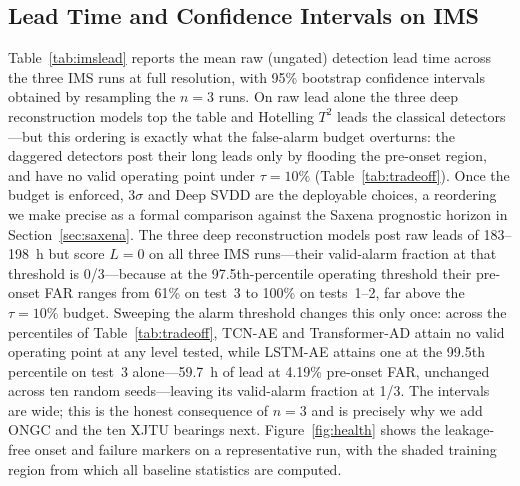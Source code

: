 \documentclass[IJPHM, 2026, 0]{PHMSociety}
\begin{document}
\subsection{Lead Time and Confidence Intervals on IMS}
Table~\ref{tab:imslead} reports the mean raw (ungated) detection lead time across the three IMS runs at full resolution, with 95\% bootstrap confidence intervals obtained by resampling the $n=3$ runs. On raw lead alone the three deep reconstruction models top the table and Hotelling $T^2$ leads the classical detectors---but this ordering is exactly what the false-alarm budget overturns: the daggered detectors post their long leads only by flooding the pre-onset region, and have no valid operating point under $\tau=10\%$ (Table~\ref{tab:tradeoff}). Once the budget is enforced, $3\sigma$ and Deep SVDD are the deployable choices, a reordering we make precise as a formal comparison against the Saxena prognostic horizon in Section~\ref{sec:saxena}. The three deep reconstruction models post raw leads of 183--198~h but score $L=0$ on all three IMS runs---their valid-alarm fraction at that threshold is 0/3---because at the 97.5th-percentile operating threshold their pre-onset FAR ranges from 61\% on test~3 to 100\% on tests~1--2, far above the $\tau=10\%$ budget. Sweeping the alarm threshold changes this only once: across the percentiles of Table~\ref{tab:tradeoff}, TCN-AE and Transformer-AD attain no valid operating point at any level tested, while LSTM-AE attains one at the 99.5th percentile on test~3 alone---59.7~h of lead at 4.19\% pre-onset FAR, unchanged across ten random seeds---leaving its valid-alarm fraction at 1/3. The intervals are wide; this is the honest consequence of $n=3$ and is precisely why we add ONGC and the ten XJTU bearings next. Figure~\ref{fig:health} shows the leakage-free onset and failure markers on a representative run, with the shaded training region from which all baseline statistics are computed.
\end{document}
